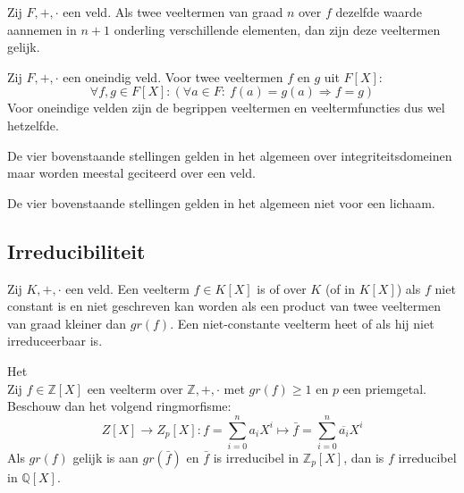 \documentclass[main.tex]{subfiles}
\begin{document}
\begin{st}
  \label{st:veeltermen-n-gelijke-beelden-gelijk}
  Zij $F,+,\cdot$ een veld.
  Als twee veeltermen van graad $n$ over $f$ dezelfde waarde aannemen in $n+1$ onderling verschillende elementen, dan zijn deze veeltermen gelijk.
\end{st}

\begin{st}
  Zij $F,+,\cdot$ een oneindig veld.
  Voor twee veeltermen $f$ en $g$ uit $F[X]$:
  \[ \forall f,g \in F[X]: (\forall a \in F:\ f(a) = g(a) \Rightarrow f = g) \]
  Voor oneindige velden zijn de begrippen veeltermen en veeltermfuncties dus wel hetzelfde.
\end{st}

\begin{opm}
  De vier bovenstaande stellingen gelden in het algemeen over integriteitsdomeinen maar worden meestal geciteerd over een veld.
\end{opm}

\begin{opm}
  De vier bovenstaande stellingen gelden in het algemeen niet voor een lichaam.
\end{opm}

\subsection{Irreducibiliteit}
\label{sec:irreducibiliteit}


\begin{de}
  \label{de:irreducibel}
  Zij $K,+,\cdot$ een veld.
  Een veelterm $f\in K[X]$ is  of  over $K$ (of in $K[X]$) als $f$ niet constant is en niet geschreven kan worden als een product van twee veeltermen van graad kleiner dan $gr(f)$.
  Een niet-constante veelterm heet  of  als hij niet irreduceerbaar is.
\end{de}

\begin{ei}
  Het \\
  Zij $f\in \mathbb{Z}[X]$ een veelterm over $\mathbb{Z},+,\cdot$ met $gr(f) \ge 1$ en $p$ een priemgetal.
  Beschouw dan het volgend ringmorfisme:
  \[ Z[X] \rightarrow Z_{p}[X]: f = \sum_{i=0}^{n}a_{i}X^{i} \mapsto \bar{f} = \sum_{i=0}^{n}\overline{a_{i}}X^{i} \]
  Als $gr(f)$ gelijk is aan $gr(\bar{f})$ en $\bar{f}$ is irreducibel in $\mathbb{Z}_{p}[X]$, dan is $f$ irreducibel in $\mathbb{Q}[X]$.
\end{ei}
\end{document}
